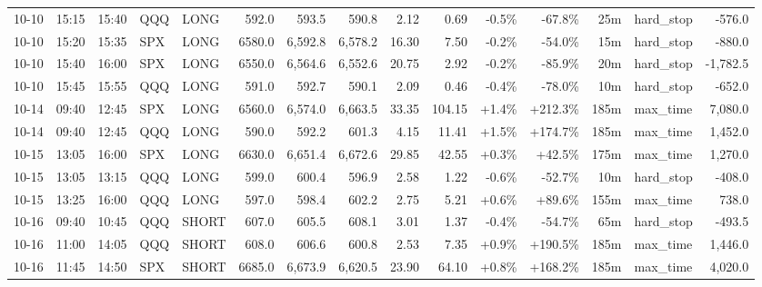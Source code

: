 \documentclass[11pt,a4paper,twoside]{article}
\begin{document}
\begin{landscape}
\begin{center}
\begin{longtable}{>{\color{txtmain}}l l l l l r r r r r r r r >{\color{txtmain}}l r}
10-10 & 15:15 & 15:40 & QQQ & LONG & 592.0 & 593.5 & 590.8 & 2.12 & 0.69 & \textcolor{lossred}{-0.5\%} & \textcolor{lossred}{-67.8\%} & 25m & hard\_stop & \textcolor{lossred}{-576.0} \\
10-10 & 15:20 & 15:35 & SPX & LONG & 6580.0 & 6,592.8 & 6,578.2 & 16.30 & 7.50 & \textcolor{lossred}{-0.2\%} & \textcolor{lossred}{-54.0\%} & 15m & hard\_stop & \textcolor{lossred}{-880.0} \\
10-10 & 15:40 & 16:00 & SPX & LONG & 6550.0 & 6,564.6 & 6,552.6 & 20.75 & 2.92 & \textcolor{lossred}{-0.2\%} & \textcolor{lossred}{-85.9\%} & 20m & hard\_stop & \textcolor{lossred}{-1,782.5} \\
10-10 & 15:45 & 15:55 & QQQ & LONG & 591.0 & 592.7 & 590.1 & 2.09 & 0.46 & \textcolor{lossred}{-0.4\%} & \textcolor{lossred}{-78.0\%} & 10m & hard\_stop & \textcolor{lossred}{-652.0} \\
10-14 & 09:40 & 12:45 & SPX & LONG & 6560.0 & 6,574.0 & 6,663.5 & 33.35 & 104.15 & \textcolor{wingreen}{+1.4\%} & \textcolor{wingreen}{+212.3\%} & 185m & max\_time & \textcolor{wingreen}{7,080.0} \\
10-14 & 09:40 & 12:45 & QQQ & LONG & 590.0 & 592.2 & 601.3 & 4.15 & 11.41 & \textcolor{wingreen}{+1.5\%} & \textcolor{wingreen}{+174.7\%} & 185m & max\_time & \textcolor{wingreen}{1,452.0} \\
10-15 & 13:05 & 16:00 & SPX & LONG & 6630.0 & 6,651.4 & 6,672.6 & 29.85 & 42.55 & \textcolor{wingreen}{+0.3\%} & \textcolor{wingreen}{+42.5\%} & 175m & max\_time & \textcolor{wingreen}{1,270.0} \\
10-15 & 13:05 & 13:15 & QQQ & LONG & 599.0 & 600.4 & 596.9 & 2.58 & 1.22 & \textcolor{lossred}{-0.6\%} & \textcolor{lossred}{-52.7\%} & 10m & hard\_stop & \textcolor{lossred}{-408.0} \\
10-15 & 13:25 & 16:00 & QQQ & LONG & 597.0 & 598.4 & 602.2 & 2.75 & 5.21 & \textcolor{wingreen}{+0.6\%} & \textcolor{wingreen}{+89.6\%} & 155m & max\_time & \textcolor{wingreen}{738.0} \\
10-16 & 09:40 & 10:45 & QQQ & SHORT & 607.0 & 605.5 & 608.1 & 3.01 & 1.37 & \textcolor{lossred}{-0.4\%} & \textcolor{lossred}{-54.7\%} & 65m & hard\_stop & \textcolor{lossred}{-493.5} \\
10-16 & 11:00 & 14:05 & QQQ & SHORT & 608.0 & 606.6 & 600.8 & 2.53 & 7.35 & \textcolor{wingreen}{+0.9\%} & \textcolor{wingreen}{+190.5\%} & 185m & max\_time & \textcolor{wingreen}{1,446.0} \\
10-16 & 11:45 & 14:50 & SPX & SHORT & 6685.0 & 6,673.9 & 6,620.5 & 23.90 & 64.10 & \textcolor{wingreen}{+0.8\%} & \textcolor{wingreen}{+168.2\%} & 185m & max\_time & \textcolor{wingreen}{4,020.0} \\

\end{longtable}
\end{center}
\end{landscape}
\end{document}

